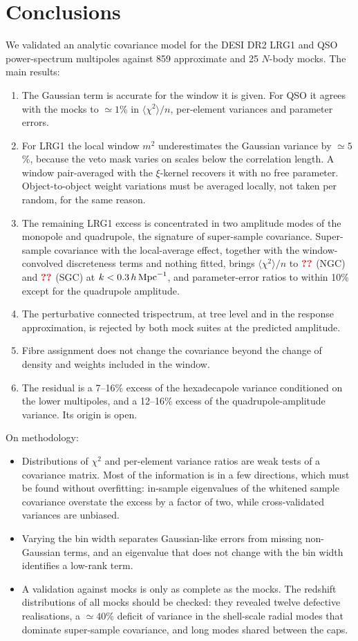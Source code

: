 \section{Conclusions}
\label{sec:conclusions}

We validated an analytic covariance model for the DESI DR2 LRG1 and QSO power-spectrum multipoles against 859 approximate and 25 $N$-body mocks. The main results:
\begin{enumerate}
\item The Gaussian term is accurate for the window it is given. For QSO it agrees with the mocks to $\simeq1$\% in $\langle\chi^2\rangle/n$, per-element variances and parameter errors.
\item For LRG1 the local window $m^2$ underestimates the Gaussian variance by $\simeq5$\%, because the veto mask varies on scales below the correlation length. A window pair-averaged with the $\xi$-kernel recovers it with no free parameter. Object-to-object weight variations must be averaged locally, not taken per random, for the same reason.
\item The remaining LRG1 excess is concentrated in two amplitude modes of the monopole and quadrupole, the signature of super-sample covariance. Super-sample covariance with the local-average effect, together with the window-convolved discreteness terms and nothing fitted, brings $\langle\chi^2\rangle/n$ to $\val{trace/LRG1/NGC/rec/0.3}$ (NGC) and $\val{trace/LRG1/SGC/rec/0.3}$ (SGC) at $k<0.3\,h\,\mathrm{Mpc}^{-1}$, and parameter-error ratios to within 10\% except for the quadrupole amplitude.
\item The perturbative connected trispectrum, at tree level and in the response approximation, is rejected by both mock suites at the predicted amplitude.
\item Fibre assignment does not change the covariance beyond the change of density and weights included in the window.
\item The residual is a 7--16\% excess of the hexadecapole variance conditioned on the lower multipoles, and a 12--16\% excess of the quadrupole-amplitude variance. Its origin is open.
\end{enumerate}

On methodology:
\begin{itemize}
\item Distributions of $\chi^2$ and per-element variance ratios are weak tests of a covariance matrix. Most of the information is in a few directions, which must be found without overfitting: in-sample eigenvalues of the whitened sample covariance overstate the excess by a factor of two, while cross-validated variances are unbiased.
\item Varying the bin width separates Gaussian-like errors from missing non-Gaussian terms, and an eigenvalue that does not change with the bin width identifies a low-rank term.
\item A validation against mocks is only as complete as the mocks. The redshift distributions of all mocks should be checked: they revealed twelve defective realisations, a $\simeq40$\% deficit of variance in the shell-scale radial modes that dominate super-sample covariance, and long modes shared between the caps.
\end{itemize}
